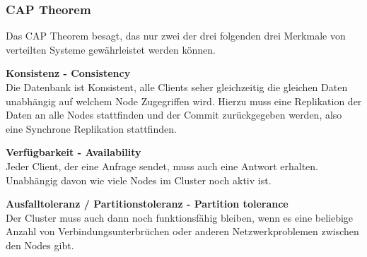
\subsubsection{CAP Theorem}
Das CAP Theorem besagt, das nur zwei der drei folgenden drei Merkmale von verteilten Systeme gewährleistet werden können\cite{EE6EQHU2}.
\begin{flushleft}
\textbf{Konsistenz - Consistency}\\
    Die Datenbank ist Konsistent, alle Clients seher gleichzeitig die gleichen Daten unabhängig auf welchem Node Zugegriffen wird.
    Hierzu muss eine Replikation der Daten an alle Nodes stattfinden und der Commit zurückgegeben werden, also eine Synchrone Replikation stattfinden.
\end{flushleft}
\begin{flushleft}
\textbf{Verfügbarkeit - Availability}\\
    Jeder Client, der eine Anfrage sendet, muss auch eine Antwort erhalten.
    Unabhängig davon wie viele Nodes im Cluster noch aktiv ist.
\end{flushleft}
\begin{flushleft}
\textbf{Ausfalltoleranz / Partitionstoleranz - Partition tolerance}\\
    Der Cluster muss auch dann noch funktionsfähig bleiben, wenn es eine beliebige Anzahl von Verbindungsunterbrüchen oder anderen Netzwerkproblemen zwischen den Nodes gibt.

\end{flushleft}
